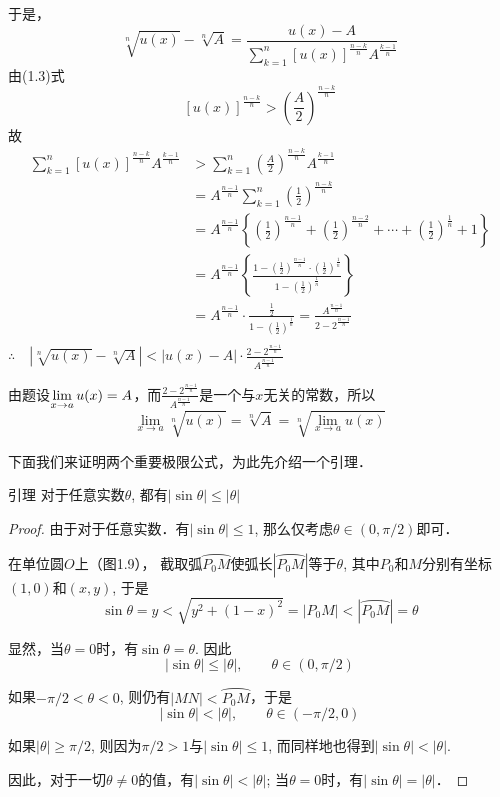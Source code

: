 于是，
\[\sqrt[n]{u(x)}-\sqrt[n]{A}=\frac{u(x)-A}{\sum^n_{k=1}[u(x)]^{\tfrac{n-k}{n}}A^{\tfrac{k-1}{n}}}\]
由(1.3)式
\[[u(x)]^{\tfrac{n-k}{n}}>\left(\frac{A}{2}\right)^{\tfrac{n-k}{n}}\]
故
\[\begin{split}
    \sum^n_{k=1}[u(x)]^{\tfrac{n-k}{n}}A^{\tfrac{k-1}{n}}&>\sum^n_{k=1}\left(\frac{A}{2}\right)^{\tfrac{n-k}{n}}A^{\tfrac{k-1}{n}}\\
    &=A^{\tfrac{n-1}{n}}\sum^n_{k=1}\left(\frac{1}{2}\right)^{\tfrac{n-k}{n}}\\
    &=A^{\tfrac{n-1}{n}}\left\{\left(\frac{1}{2}\right)^{\tfrac{n-1}{n}}+\left(\frac{1}{2}\right)^{\tfrac{n-2}{n}}+\cdots+\left(\frac{1}{2}\right)^{\tfrac{1}{n}}+1\right\}\\
    &=A^{\tfrac{n-1}{n}}\left\{\frac{1-\left(\frac{1}{2}\right)^{\tfrac{n-1}{n}}\cdot \left(\frac{1}{2}\right)^{\tfrac{1}{n}}}{1-\left(\frac{1}{2}\right)^{\tfrac{1}{n}}}\right\}\\
    &=A^{\tfrac{n-1}{n}}\cdot\frac{\frac{1}{2}}{1-\left(\frac{1}{2}\right)^{\tfrac{1}{n}}}=\frac{A^{\tfrac{n-1}{n}}}{2-2^{\tfrac{n-1}{n}}}\\
\end{split}\]
$\therefore\quad \left|\sqrt[n]{u(x)}-\sqrt[n]{A}\right|<|u(x)-A|\cdot \frac{2-2^{\tfrac{n-1}{n}}}{A^{\tfrac{n-1}{n}}}$

由题设$\displaystyle\lim_{x\to a}u(x)=A$，而$\frac{2-2^{\tfrac{n-1}{n}}}{A^{\tfrac{n-1}{n}}}$是一个与$x$无关的常数，所以
\[\lim_{x\to a} \sqrt[n]{u(x)}=\sqrt[n]{A}=\sqrt[n]{\lim_{x\to a}u(x)}\]

下面我们来证明两个重要极限公式，为此先介绍一个引理．

\begin{blk}{引理}
     对于任意实数$\theta$, 都有$|\sin\theta|\le |\theta|$
\end{blk}

\begin{proof}
  由于对于任意实数．有$|\sin\theta|\le 1$, 那么仅考虑$\theta\in (0,\pi/2)$即可．
  
  在单位圆$O$上（图1.9），
 截取弧$\wideparen{P_0M}$使弧长$|\wideparen{P_0M}|$等于$\theta$, 其中$P_0$和$M$分别有坐标$(1, 0)$和$(x,y)$, 于是
 \[\sin\theta =y<\sqrt{y^2+ (1-x)^2} =|P_0M|<|\wideparen{P_0M}|=\theta\]
 
 显然，当$\theta=0$时，有$\sin\theta=\theta$. 因此
\[  |\sin\theta | \le |\theta|,\qquad  \theta\in  (0,\pi/2)\]

  如果$-\pi/2<\theta<0$, 则仍有$|MN|<\wideparen{P_0M}$，于是
\[|\sin\theta|<|\theta|,\qquad \theta\in (-\pi/2, 0) \]

  如果$|\theta|\ge \pi/2$, 则因为$\pi/2>1$与$|\sin\theta|\le 1$, 而同样地也得到$|\sin\theta|<|\theta|$. 
  
  因此，对于一切$\theta\ne 0$的值，有$|\sin\theta|<|\theta|$; 当$\theta=0$时，有$|\sin\theta|=|\theta|$．
\end{proof}



